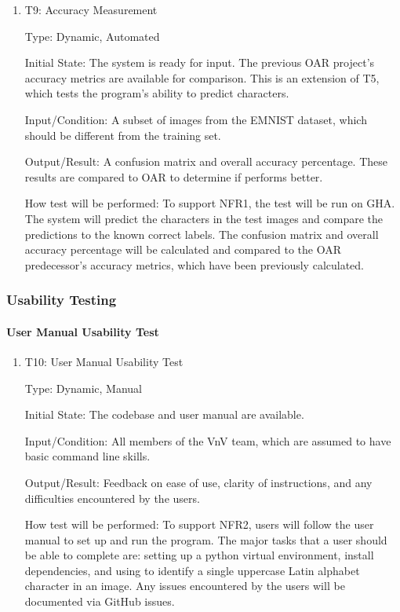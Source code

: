 \documentclass[12pt, titlepage]{article}
\begin{document}
\begin{enumerate}

\item{T9: Accuracy Measurement\\}

Type: Dynamic, Automated
					
Initial State: The \progname{} system is ready for input. The previous
OAR project's accuracy metrics are available for comparison. This is an
extension of T5, which tests the program's ability to predict characters.
					
Input/Condition: A subset of images from the EMNIST dataset, which should be
different from the training set.
					
Output/Result: A confusion matrix and overall accuracy percentage. These results
are compared to OAR to determine if \progname{} performs better.
					
How test will be performed: To support NFR1, the test will be run on GHA. The
system will predict the characters in the test images and compare the
predictions to the known correct labels. The confusion matrix and overall
accuracy percentage will be calculated and compared to the OAR predecessor's
accuracy metrics, which have been previously calculated.

\end{enumerate}

\subsubsection{Usability Testing}

\paragraph{User Manual Usability Test}

\begin{enumerate}

\item{T10: User Manual Usability Test\\}

Type: Dynamic, Manual
					
Initial State: The codebase and user manual are available.
					
Input/Condition: All members of the VnV team, which are assumed to have basic
command line skills.
					
Output/Result: Feedback on ease of use, clarity of instructions, and any
difficulties encountered by the users.
					
How test will be performed: To support NFR2, users will follow the user manual
to set up and run the \progname{} program. The major tasks that a user should be
able to complete are: setting up a python virtual environment, install dependencies,
and using \progname{} to identify a single uppercase Latin alphabet character
in an image. Any issues encountered by the users will be documented via GitHub
issues.
\end{enumerate}
\end{document}
